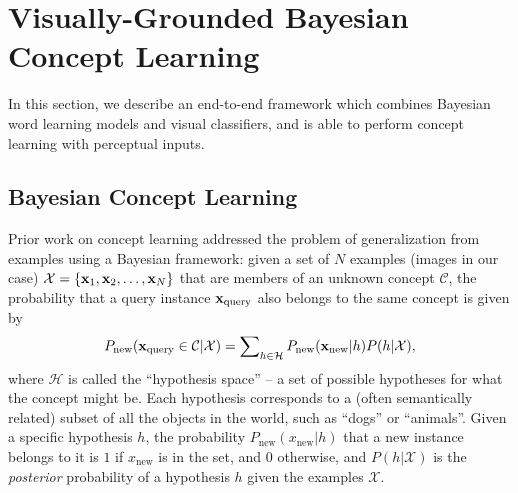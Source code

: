 \section{Visually-Grounded Bayesian Concept Learning}

In this section, we describe an end-to-end framework which combines Bayesian word learning models and visual classifiers, and is able to perform concept learning with perceptual inputs. 

\subsection{Bayesian Concept Learning}
Prior work on concept learning \cite{xu2007word} addressed the problem of generalization from examples using a Bayesian framework: given a set of $N$ examples (images in our case) $\mathcal{X} = \{ \mathbf{x}_1, \mathbf{x}_2,\ldots, \mathbf{x}_N \}$ that are members of an unknown concept $\mathcal{C}$, the probability that a query instance $\mathbf{x}_\mathrm{query}$ also belongs to the same concept is given by
\begin{equation}
P_{\mathrm{new}}(\mathbf{x}_\mathrm{query} \in \mathcal{C}|\mathcal{X}) = \sum\nolimits_{h \in \mathcal{H}} P_{\mathrm{new}}(\mathbf{x}_\mathrm{new} | h)P(h|\mathcal{X}), \label{eq:bayeswl}
\end{equation}
where $\mathcal{H}$ is called the ``hypothesis space'' -- a set of possible hypotheses for what the concept might be. Each hypothesis corresponds to a (often semantically related) subset of all the objects in the world, such as ``dogs'' or ``animals''. Given a specific hypothesis $h$, the probability $P_{\mathrm{new}}(x_\mathrm{new}|h)$ that a new instance belongs to it is $1$ if $x_\mathrm{new}$ is in the set, and $0$ otherwise, and $P(h | \mathcal{X})$ is the \emph{posterior} probability of a hypothesis $h$ given the examples $\mathcal{X}$.

